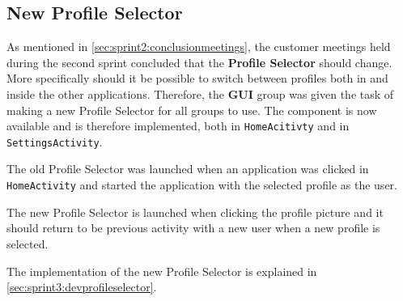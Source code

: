 \subsection{New Profile Selector}\label{sec:sprint3:designprofileselector}

As mentioned in \cref{sec:sprint2:conclusionmeetings}, the customer meetings held during the second sprint concluded that the \textbf{Profile Selector} should change.
More specifically should it be possible to switch between profiles both in \launcher and inside the other \giraf applications.
Therefore, the \textbf{GUI} group was given the task of making a new Profile Selector for all groups to use.
The component is now available and is therefore implemented, both in \lstinline!HomeAcitivty! and in \lstinline!SettingsActivity!. 

The old Profile Selector was launched when an application was clicked in \lstinline!HomeActivity! and started the application with the selected profile as the user.

The new Profile Selector is launched when clicking the profile picture and it should return to be previous activity with a new user when a new profile is selected.

The implementation of the new Profile Selector is explained in \cref{sec:sprint3:devprofileselector}.